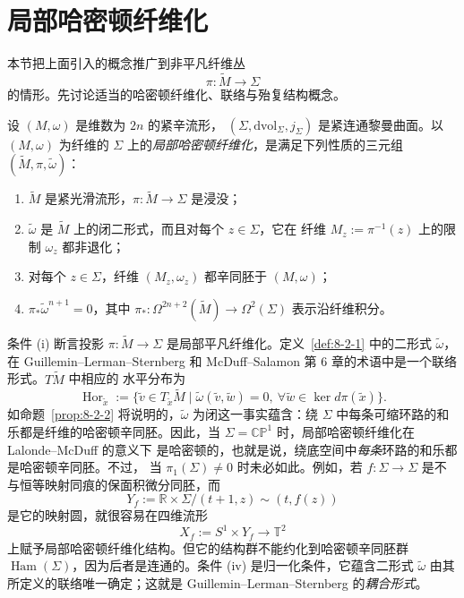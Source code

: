 
\section{局部哈密顿纤维化}\label{sec:8-2}

本节把上面引入的概念推广到非平凡纤维丛
\[
  \pi:\widetilde M\longrightarrow\Sigma
\]
的情形。先讨论适当的哈密顿纤维化、联络与殆复结构概念。

\begin{definition}\label{def:8-2-1}
设 $(M,\omega)$ 是维数为 $2n$ 的紧辛流形，
$(\Sigma,\mathrm{dvol}_\Sigma,j_\Sigma)$ 是紧连通黎曼曲面。以 $(M,\omega)$ 为纤维的
$\Sigma$ 上的\emph{局部哈密顿纤维化}，是满足下列性质的三元组
$(\widetilde M,\pi,\widetilde\omega)$：
\begin{enumerate}[label=\textup{(\roman*)},leftmargin=3em]
\item $\widetilde M$ 是紧光滑流形，$\pi:\widetilde M\to\Sigma$ 是浸没；
\item $\widetilde\omega$ 是 $\widetilde M$ 上的闭二形式，而且对每个 $z\in\Sigma$，它在
纤维 $M_z:=\pi^{-1}(z)$ 上的限制 $\omega_z$ 都非退化；
\item 对每个 $z\in\Sigma$，纤维 $(M_z,\omega_z)$ 都辛同胚于 $(M,\omega)$；
\item $\pi_*\widetilde\omega^{n+1}=0$，其中
$\pi_*:\Omega^{2n+2}(\widetilde M)\to\Omega^2(\Sigma)$ 表示沿纤维积分。
\end{enumerate}
\end{definition}

条件 (i) 断言投影 $\pi:\widetilde M\to\Sigma$ 是局部平凡纤维化。定义~\ref{def:8-2-1}
中的二形式 $\widetilde\omega$，在 Guillemin--Lerman--Sternberg  和
McDuff--Salamon  第 6 章的术语中是一个联络形式。$T\widetilde M$ 中相应的
水平分布为
\begin{equation}\label{eq:8-2-1}
  \operatorname{Hor}_{\widetilde x}
  :=\bigl\{\widetilde v\in T_{\widetilde x}\widetilde M
  \mid \widetilde\omega(\widetilde v,\widetilde w)=0,
  \ \forall\widetilde w\in\ker d\pi(\widetilde x)\bigr\}.
\end{equation}
如命题~\ref{prop:8-2-2} 将说明的，$\widetilde\omega$ 为闭这一事实蕴含：绕
$\Sigma$ 中每条可缩环路的和乐都是纤维的哈密顿辛同胚。因此，当
$\Sigma=\mathbb{CP}^1$ 时，局部哈密顿纤维化在 Lalonde--McDuff  的意义下
是哈密顿的，也就是说，绕底空间中\emph{每条}环路的和乐都是哈密顿辛同胚。不过，
当 $\pi_1(\Sigma)\ne0$ 时未必如此。例如，若
$f:\Sigma\to\Sigma$ 是不与恒等映射同痕的保面积微分同胚，而
\[
  Y_f:=\mathbb R\times\Sigma/(t+1,z)\sim(t,f(z))
\]
是它的映射圆，就很容易在四维流形
\[
  X_f:=S^1\times Y_f\longrightarrow\mathbb T^2
\]
上赋予局部哈密顿纤维化结构。但它的结构群不能约化到哈密顿辛同胚群
$\operatorname{Ham}(\Sigma)$，因为后者是连通的。条件 (iv) 是归一化条件，它蕴含二形式
$\widetilde\omega$ 由其所定义的联络唯一确定；这就是
Guillemin--Lerman--Sternberg  的\emph{耦合形式}。

